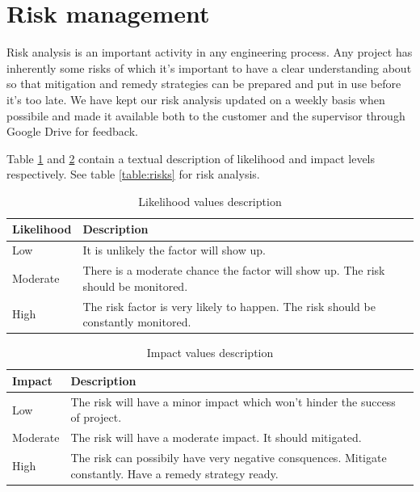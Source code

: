 \newpage
\section{Risk management}
\label{section:risk}

Risk analysis is an important activity in any engineering process.
Any project has inherently some risks of which it's important to have a clear
understanding about so that mitigation and remedy strategies can be prepared
and put in use before it's too late. We have kept our risk analysis updated on a weekly
basis when possibile and made it available both to the customer and the supervisor through
Google Drive for feedback.

Table \ref{table:likelihood} and \ref{table:impact} contain a textual description of
likelihood and impact levels respectively. See table \ref{table:risks} for risk analysis.

\begin{table}[h]
\begin{tabular}{ | l | p{11.5cm} | }
  \hline
  \textbf{Likelihood} & \textbf{Description} \\
  \hline\noalign{\smallskip}\hline
  Low       & It is unlikely the factor will show up. \\
  Moderate  & There is a moderate chance the factor will show up. The risk should be monitored. \\
  High      & The risk factor is very likely to happen. The risk should be constantly monitored. \\
  \hline
\end{tabular}
\caption{Likelihood values description}
\label{table:likelihood}
\end{table}

\begin{table}[h]
\begin{tabular}{ | l | p{11.5cm} | }
  \hline
  \textbf{Impact} & \textbf{Description} \\
  \hline\noalign{\smallskip}\hline
  Low       & The risk will have a minor impact which won't hinder the success of project. \\
  Moderate  & The risk will have a moderate impact. It should mitigated. \\
  High      & The risk can possibily have very negative consquences. Mitigate constantly. Have a remedy strategy ready. \\
  \hline
\end{tabular}
\caption{Impact values description}
\label{table:impact}
\end{table}

